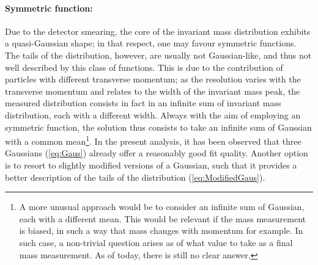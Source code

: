 \paragraph{Symmetric function:} Due to the detector smearing, the core of the invariant mass distribution exhibits a quasi-Gaussian shape; in that respect, one may favour symmetric functions. The tails of the distribution, however, are usually not Gaussian-like, and thus not well described by this class of functions. This is due to the contribution of particles with different transverse momentum; as the \pT resolution varies with the transverse momentum and relates to the width of the invariant mass peak, the measured distribution consists in fact in an infinite sum of invariant mass distribution, each with a different width. Always with the aim of employing an symmetric function, the solution thus consists to take an infinite sum of Gaussian with a common mean\footnote{A more unusual approach would be to consider an infinite sum of Gaussian, each with a different mean. This would be relevant if the mass measurement is biased, in such a way that mass changes with momentum for example. In such case, a non-trivial question arises as of what value to take as a final mass measurement. As of today, there is still no clear answer.}. In the present analysis, it has been observed that three Gaussians (\eq\ref{eq:Gaus}) already offer a reasonably good fit quality. Another option is to resort to slightly modified versions of a Gaussian, such that it provides a better description of the tails of the distribution (\eq\ref{eq:ModifiedGaus}).

